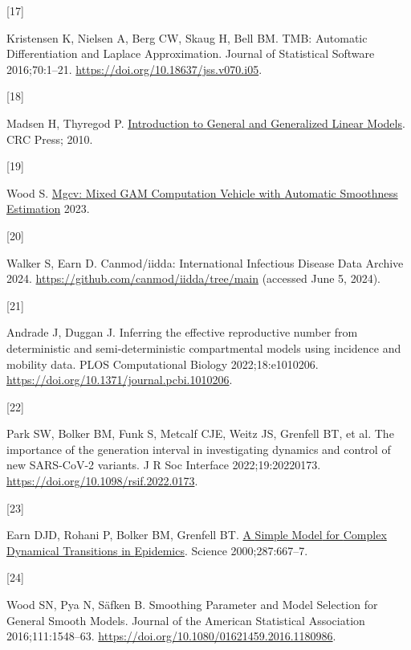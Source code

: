 \documentclass[
11pt, %
oneside, %
english, %
singlespacing, %
]{macthesis} %
\newlength{\cslhangindent}
\newlength{\csllabelwidth}
\newenvironment{CSLReferences}[2] %
{\begin{list}{}{%
	\setlength{\itemindent}{0pt}
	\setlength{\leftmargin}{0pt}
	\setlength{\parsep}{0pt}
	\ifodd #1
	\setlength{\leftmargin}{\cslhangindent}
	\setlength{\itemindent}{-1\cslhangindent}
	\fi
	\setlength{\itemsep}{#2\baselineskip}}}
{\end{list}}
\newcommand{\CSLLeftMargin}[1]{\parbox[t]{\csllabelwidth}{\strut#1\strut}}
\newcommand{\CSLRightInline}[1]{\parbox[t]{\linewidth - \csllabelwidth}{\strut#1\strut}}
\begin{document}
\begin{CSLReferences}{0}{0}
\CSLLeftMargin{{[}17{]} }%
\CSLRightInline{Kristensen K, Nielsen A, Berg CW, Skaug H, Bell BM. {TMB}: {Automatic Differentiation} and {Laplace Approximation}. Journal of Statistical Software 2016;70:1--21. \url{https://doi.org/10.18637/jss.v070.i05}.}

\CSLLeftMargin{{[}18{]} }%
\CSLRightInline{Madsen H, Thyregod P. \href{http://gen.lib.rus.ec/book/index.php?md5=d9ba089c485d875f0dbfdfb40d7f990a}{Introduction to {General} and {Generalized Linear Models}}. CRC Press; 2010.}

\CSLLeftMargin{{[}19{]} }%
\CSLRightInline{Wood S. \href{https://cran.r-project.org/web/packages/mgcv/index.html}{Mgcv: {Mixed GAM Computation Vehicle} with {Automatic Smoothness Estimation}} 2023.}

\CSLLeftMargin{{[}20{]} }%
\CSLRightInline{Walker S, Earn D. Canmod/iidda: {International Infectious Disease Data Archive} 2024. \url{https://github.com/canmod/iidda/tree/main} (accessed June 5, 2024).}

\CSLLeftMargin{{[}21{]} }%
\CSLRightInline{Andrade J, Duggan J. Inferring the effective reproductive number from deterministic and semi-deterministic compartmental models using incidence and mobility data. PLOS Computational Biology 2022;18:e1010206. \url{https://doi.org/10.1371/journal.pcbi.1010206}.}

\CSLLeftMargin{{[}22{]} }%
\CSLRightInline{Park SW, Bolker BM, Funk S, Metcalf CJE, Weitz JS, Grenfell BT, et al. The importance of the generation interval in investigating dynamics and control of new {SARS-CoV-2} variants. J R Soc Interface 2022;19:20220173. \url{https://doi.org/10.1098/rsif.2022.0173}.}

\CSLLeftMargin{{[}23{]} }%
\CSLRightInline{Earn DJD, Rohani P, Bolker BM, Grenfell BT. \href{https://go-gale-com.libaccess.lib.mcmaster.ca/ps/i.do?p=AONE&sw=w&issn=00368075&v=2.1&it=r&id=GALE\%7CA59410262&sid=googleScholar&linkaccess=abs}{A {Simple Model} for {Complex Dynamical Transitions} in {Epidemics}}. Science 2000;287:667--7.}

\CSLLeftMargin{{[}24{]} }%
\CSLRightInline{Wood SN, Pya N, Säfken B. Smoothing {Parameter} and {Model Selection} for {General Smooth Models}. Journal of the American Statistical Association 2016;111:1548--63. \url{https://doi.org/10.1080/01621459.2016.1180986}.}


\end{CSLReferences}
\end{document}
